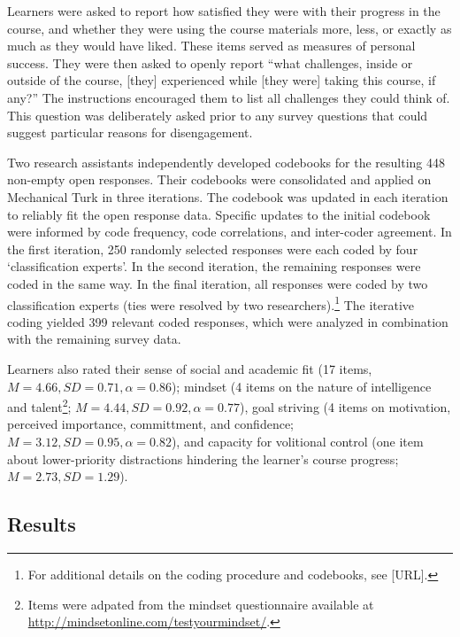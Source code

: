 \documentclass{sigchi}\usepackage[]{graphicx}\usepackage[]{color}
\begin{document}
Learners were asked to report how satisfied they were with their progress in the course, and whether they were using the course materials more, less, or exactly as much as they would have liked. These items served as measures of personal success.
They were then asked to openly report ``what challenges, inside or outside of the course, [they] experienced while [they were] taking this course, if any?'' The instructions encouraged them to list all challenges they could think of. This question was deliberately asked prior to any survey questions that could suggest particular reasons for disengagement.

Two research assistants independently developed codebooks for the resulting 448 non-empty open responses. Their codebooks were consolidated and applied on Mechanical Turk in three iterations. The codebook was updated in each iteration to reliably fit the open response data. Specific updates to the initial codebook were informed by code frequency, code correlations, and inter-coder agreement. In the first iteration, 250 randomly selected responses were each coded by four `classification experts'. In the second iteration, the remaining responses were coded in the same way. In the final iteration, all responses were coded by two classification experts (ties were resolved by two researchers).\footnote{For additional details on the coding procedure and codebooks, see [URL].} The iterative coding yielded 399 relevant coded responses, which were analyzed in combination with the remaining survey data.

Learners also rated their sense of social and academic fit \cite{walton2007question} (17 items, $M=4.66, SD=0.71, \alpha=0.86$); mindset (4 items on the nature of intelligence and talent\footnote{Items were adpated from the mindset questionnaire available at \url{http://mindsetonline.com/testyourmindset/}.}; $M=4.44, SD=0.92, \alpha=0.77$), goal striving (4 items on motivation, perceived importance, committment, and confidence; $M=3.12, SD=0.95, \alpha=0.82$), and capacity for volitional control (one item about lower-priority distractions hindering the learner's course progress; $M=2.73, SD=1.29$).

\subsection{Results}
\end{document}
